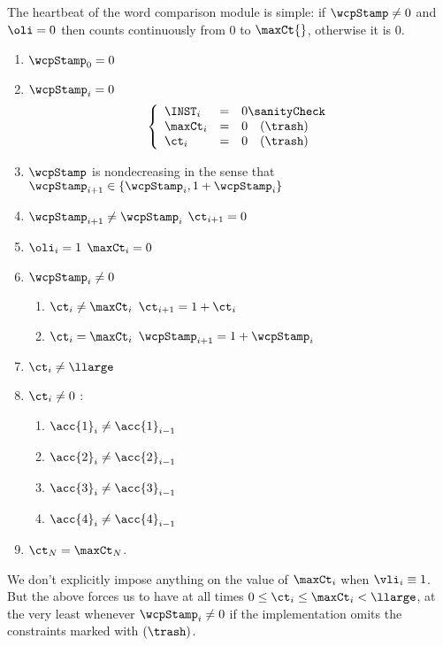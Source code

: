 The heartbeat of the word comparison module is simple: if $\wcpStamp \neq 0$ and $\oli = 0$ then \ct{} counts continuously from $0$ to $\maxCt{}$, otherwise it is $0$.
\begin{enumerate}
	\item $\wcpStamp_{0} = 0$
	\item \If $\wcpStamp_{i} = 0$ \Then
		\[
			\left\{ \begin{array}{lcl}
			    \INST_{i}  & = & 0 \sanityCheck   \\
				\maxCt_{i} & = & 0 \quad (\trash) \\
				\ct_{i}    & = & 0 \quad (\trash) \\
			\end{array} \right.
		\]
	\item $\wcpStamp$ is nondecreasing in the sense that $\wcpStamp_{i + 1} \in \{ \wcpStamp_{i}, 1 + \wcpStamp_{i} \}$
	\item \If $\wcpStamp_{i + 1} \neq \wcpStamp_{i}$ \Then $\ct_{i + 1} = 0$
	\item \If $\oli_{i} = 1$ \Then $\maxCt_{i}=0$
	\item \If $\wcpStamp_{i} \neq 0$ \Then
		\begin{enumerate}
			\item \If $\ct_{i} \neq \maxCt_{i}$ \Then $\ct_{i + 1} = 1 + \ct_{i}$
			\item \If $\ct_{i} =    \maxCt_{i}$ \Then $\wcpStamp_{i + 1} = 1 + \wcpStamp_{i}$
		\end{enumerate}
	\item $\ct_{i} \neq \llarge$
	\item \If $\ct_{i} \neq 0$ \Then: 
	\begin{enumerate}
			\item \Or $\acc{1}_{i} \neq \acc{1}_{i-1}$
			\item \Or $\acc{2}_{i} \neq \acc{2}_{i-1}$
			\item \Or $\acc{3}_{i} \neq \acc{3}_{i-1}$
			\item \Or $\acc{4}_{i} \neq \acc{4}_{i-1}$
	\end{enumerate}	
	\item $\ct_{N} = \maxCt_{N}$.
\end{enumerate}
\saNote{} We don't explicitly impose anything on the value of $\maxCt_i$ when $\vli_i \equiv 1$.
But the above forces us to have at all times $0 \leq \ct_{i} \leq \maxCt_{i} < \llarge$, at the very least whenever $\wcpStamp_{i} \neq 0$ if the implementation omits the constraints marked with $(\trash)$.
